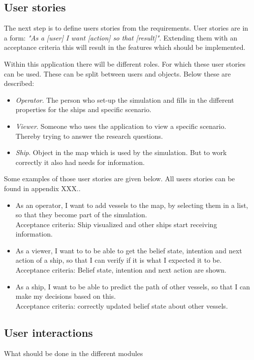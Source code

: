 \subsection{User stories}
The next step is to define users stories from the requirements. User stories are in a form: \emph{"As a [user] I want [action] so that [result]"}. Extending them with an acceptance criteria this will result in the features which should be implemented.

Within this application there will be different roles. For which these user stories can be used. These can be split between users and objects. Below these are described:
\begin{itemize}
	\item \emph{Operator}. The person who set-up the simulation and fills in the different properties for the ships and specific scenario.
	\item \emph{Viewer}. Someone who uses the application to view a specific scenario. Thereby trying to answer the research questions.
	\item \emph{Ship}. Object in the map which is used by the simulation. But to work correctly it also had needs for information.
\end{itemize}

Some examples of those user stories are given below. All users stories can be found in appendix XXX.. 

\begin{itemize}
	\item As an operator, I want to add vessels to the map, by selecting them in a list, so that they become part of the simulation. \\
	Acceptance criteria: Ship visualized and other ships start receiving information.
	\item As a viewer, I want to to be able to get the belief state, intention and next action of a ship, so that I can verify if it is what I expected it to be. \\
	Acceptance criteria: Belief state, intention and next action are shown.
	\item As a ship, I want to be able to predict the path of other vessels, so that I can make my decisions based on this. \\
	Acceptance criteria: correctly updated belief state about other vessels.
\end{itemize}

\subsection{User interactions}
What should be done in the different modules

